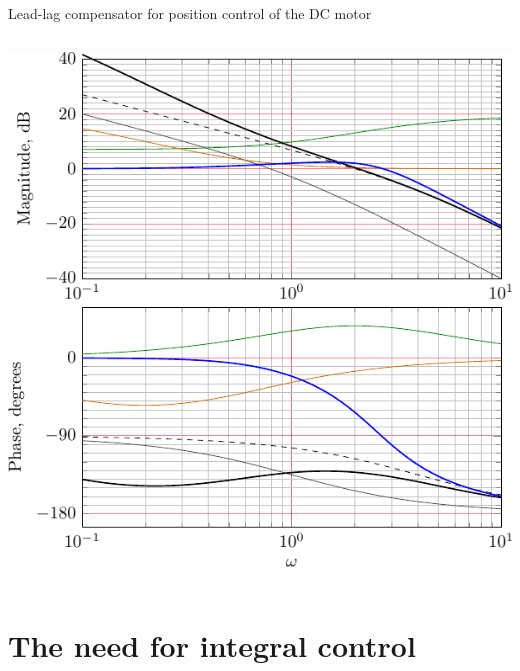 \documentclass[presentation,aspectratio=169, usenames, dvipsnames]{beamer}
\begin{document}
\begin{frame}[label={sec:org21e4644}]{Lead-lag compensator for position control of the DC motor}
\begin{columns}
\begin{column}{0.5\columnwidth}
\begin{center}
  \includegraphics[width=.8\linewidth]{../../figures/bode-loop-gain-leadlag-normalized-DC-crop}
\end{center}
\end{column}
\end{columns}
\end{frame}

\section{The need for integral control}
\label{sec:orgf566f1e}
\end{document}
